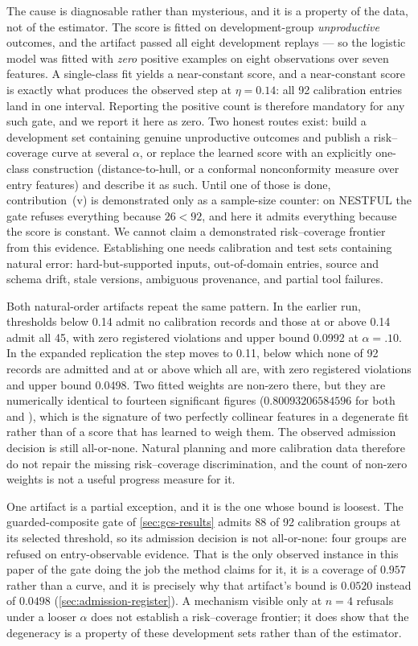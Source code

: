 The cause is diagnosable rather than mysterious, and it is a property of the data, not of the
estimator.  The score is fitted on development-group \emph{unproductive} outcomes, and the
artifact passed all eight development replays --- so the logistic model was fitted with
\emph{zero} positive examples on eight observations over seven features.  A single-class fit
yields a near-constant score, and a near-constant score is exactly what produces the observed
step at $\eta=0.14$: all 92 calibration entries land in one interval.  Reporting the positive
count is therefore mandatory for any such gate, and we report it here as zero.  Two honest
routes exist: build a development set containing genuine unproductive outcomes and publish a
risk--coverage curve at several $\alpha$, or replace the learned score with an explicitly
one-class construction (distance-to-hull, or a conformal nonconformity measure over entry
features) and describe it as such.  Until one of those is done, contribution~(v) is
demonstrated only as a sample-size counter: on NESTFUL the gate refuses everything because
$26<92$, and here it admits everything because the score is constant.  We cannot claim a demonstrated risk--coverage frontier
from this evidence.  Establishing one needs calibration and test sets containing natural
error: hard-but-supported inputs, out-of-domain entries, source and schema drift, stale
versions, ambiguous provenance, and partial tool failures.

Both natural-order artifacts repeat the same pattern.  In the earlier run, thresholds
below 0.14 admit no calibration records and those at or above 0.14 admit all 45, with zero
registered violations and upper bound 0.0992 at $\alpha=.10$.  In the expanded replication
the step moves
to 0.11, below which none of 92 records are admitted and at or above which all are, with
zero registered violations and upper bound 0.0498.  Two fitted weights are non-zero there,
but they are numerically identical to fourteen significant figures
($0.80093206584596$ for both  and ), which
is the signature of two perfectly collinear features in a degenerate fit rather than of a
score that has learned to weigh them.  The observed admission decision is still
all-or-none.  Natural planning and more
calibration data therefore do not repair the missing risk--coverage discrimination, and the
count of non-zero weights is not a useful progress measure for it.

One artifact is a partial exception, and it is the one whose bound is loosest.  The
guarded-composite gate of \cref{sec:gcs-results} admits 88 of 92 calibration groups at its
selected threshold, so its admission decision is not all-or-none: four groups are refused
on entry-observable evidence.  That is the only observed instance in this paper of the gate
doing the job the method claims for it, it is a coverage of $0.957$ rather than a curve, and
it is precisely why that artifact's bound is $0.0520$ instead of $0.0498$
(\cref{sec:admission-register}).  A mechanism visible only at $n=4$ refusals under a
looser $\alpha$ does not establish a risk--coverage frontier; it does show that the
degeneracy is a property of these development sets rather than of the estimator.

